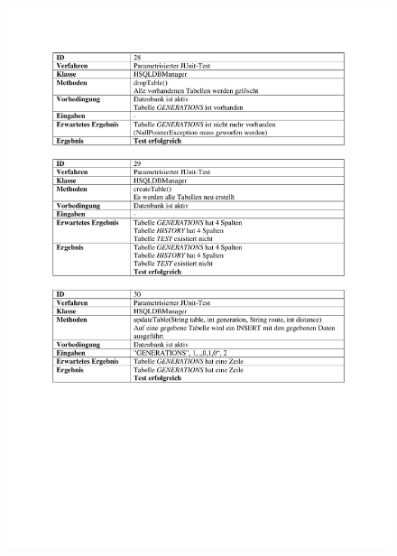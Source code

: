 \begin{appendices}
\begin{figure}[h]
		\includegraphics[width=\linewidth]{images/Testfaelle_HSQLDB_Seite_2.pdf}
		\label{testHSQLDB2}
	\end{figure}
\end{appendices}